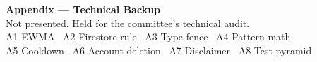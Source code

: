 \documentclass[aspectratio=169,11pt]{beamer}
\begin{document}
\appendix

\begin{frame}[plain]
  \centering\vfill
  {\Large\bfseries\color{moodgreendark} Appendix --- Technical Backup}\\[0.4em]
  {\footnotesize\color{gray!70} Not presented. Held for the committee's technical audit.\\
  A1 EWMA \textperiodcentered\ A2 Firestore rule \textperiodcentered\ A3 Type fence \textperiodcentered\ A4 Pattern math\\
  A5 Cooldown \textperiodcentered\ A6 Account deletion \textperiodcentered\ A7 Disclaimer \textperiodcentered\ A8 Test pyramid}
  \vfill
\end{frame}
\end{document}
